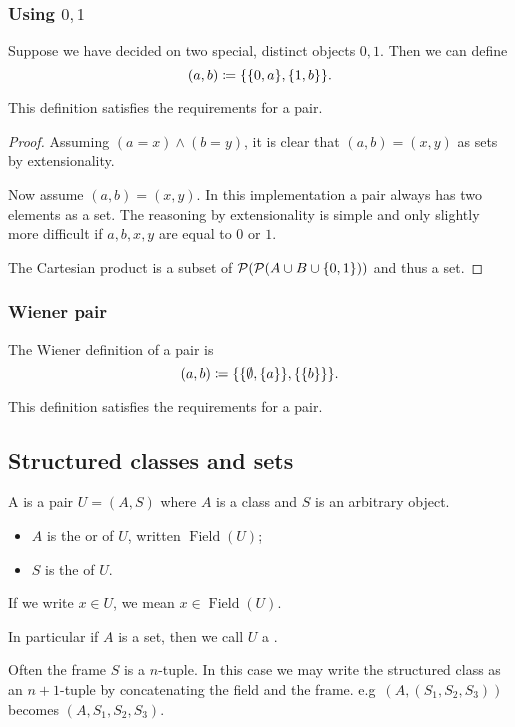 \subsubsection{Using $0,1$}
Suppose we have decided on two special, distinct objects $0,1$. Then we can define
\[ (a,b) \coloneqq \{\{0,a\},\{1,b\}\}. \]
\begin{proposition}
This definition satisfies the requirements for a pair.
\end{proposition}
\begin{proof}
Assuming $(a=x)\land (b=y)$, it is clear that $(a,b)=(x,y)$ as sets by extensionality.

Now assume $(a,b)=(x,y)$. In this implementation a pair always has two elements as a set. The reasoning by extensionality is simple and only slightly more difficult if $a,b,x,y$ are equal to $0$ or $1$.

The Cartesian product is a subset of $\operatorname{\mathcal{P}}(\operatorname{\mathcal{P}}(A\cup B\cup \{0,1\}))$ and thus a set.
\end{proof}
\subsubsection{Wiener pair}
The Wiener definition of a pair is
\[ (a,b) \coloneqq \{\{\emptyset,\{a\}\},\{\{b\}\}\}. \]
\begin{proposition}
This definition satisfies the requirements for a pair.
\end{proposition}

\subsection{Structured classes and sets}
\begin{definition}
A  is a pair $U = (A,S)$ where $A$ is a class and $S$ is an arbitrary object.
\begin{itemize}
\item $A$ is the  or  of $U$, written $\operatorname{Field}(U)$;
\item $S$ is the  of $U$.
\end{itemize}
If we write $x\in U$, we mean $x\in \operatorname{Field}(U)$.

In particular if $A$ is a set, then we call $U$ a .
\end{definition}

Often the frame $S$ is a $n$-tuple. In this case we may write the structured class as an $n+1$-tuple by concatenating the field and the frame. e.g\ $(A,(S_1,S_2,S_3))$ becomes $(A,S_1,S_2,S_3)$.

